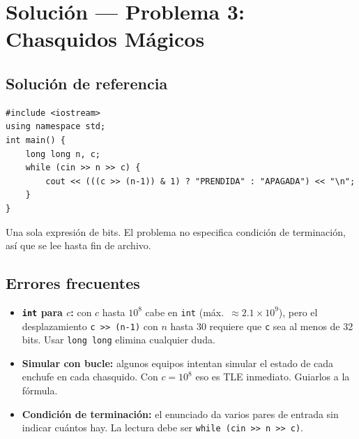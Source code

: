 \documentclass[12pt, oneside]{article}
\begin{document}
\newpage

\section{Solución — Problema 3: Chasquidos Mágicos}

\subsection{Solución de referencia}

\begin{notaprofesor}
\begin{verbatim}
#include <iostream>
using namespace std;
int main() {
    long long n, c;
    while (cin >> n >> c) {
        cout << (((c >> (n-1)) & 1) ? "PRENDIDA" : "APAGADA") << "\n";
    }
}
\end{verbatim}
  Una sola expresión de bits.  El problema no especifica condición de
  terminación, así que se lee hasta fin de archivo.
\end{notaprofesor}

\subsection{Errores frecuentes}

\begin{notaprofesor}
  \begin{itemize}
    \item \textbf{\texttt{int} para $c$:} con $c$ hasta $10^8$ cabe en
          \texttt{int} (máx.\ $\approx 2.1 \times 10^9$), pero el desplazamiento
          \texttt{c >> (n-1)} con $n$ hasta 30 requiere que \texttt{c} sea al
          menos de 32 bits.  Usar \texttt{long long} elimina cualquier duda.
    \item \textbf{Simular con bucle:} algunos equipos intentan simular el
          estado de cada enchufe en cada chasquido.  Con $c = 10^8$ eso es
          TLE inmediato.  Guiarlos a la fórmula.
    \item \textbf{Condición de terminación:} el enunciado da varios pares
          de entrada sin indicar cuántos hay.  La lectura debe ser
          \texttt{while (cin >> n >> c)}.
  \end{itemize}
\end{notaprofesor}
\end{document}
